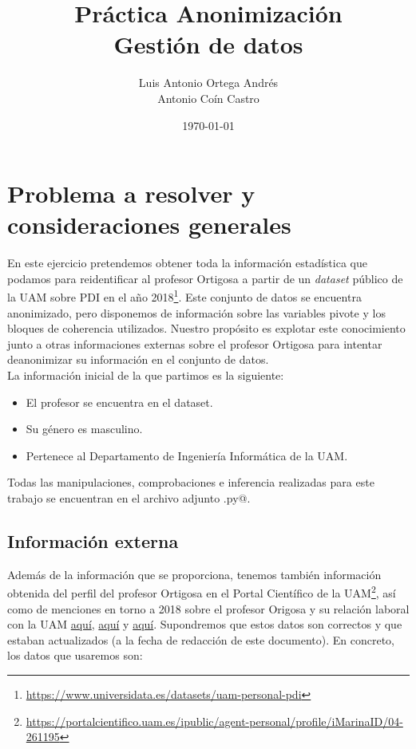 \documentclass[11pt]{article}
\author{Luis Antonio Ortega Andrés\\Antonio Coín Castro}
\date{\today}
\title{Práctica Anonimización\\\medskip
\large Gestión de datos}
\begin{document}
\maketitle

\section{Problema a resolver y consideraciones generales}

En este ejercicio pretendemos obtener toda la información estadística que podamos para reidentificar al profesor Ortigosa a partir de un \textit{dataset} público de la UAM sobre PDI en el año 2018\footnote{\href{https://www.universidata.es/datasets/uam-personal-pdi}{https://www.universidata.es/datasets/uam-personal-pdi}}. Este conjunto de datos se encuentra anonimizado, pero disponemos de información sobre las variables pivote y los bloques de coherencia utilizados. Nuestro propósito es explotar este conocimiento junto a otras informaciones externas sobre el profesor Ortigosa para intentar deanonimizar su información en el conjunto de datos.\\

La información inicial de la que partimos es la siguiente:

\begin{itemize}
  \item El profesor se encuentra en el dataset.
  \item Su género es masculino.
  \item Pertenece al Departamento de Ingeniería Informática de la UAM.
\end{itemize}

Todas las manipulaciones, comprobaciones e inferencia realizadas para este trabajo se encuentran en el archivo adjunto \verb@anon.py@.

\subsection{Información externa}

Además de la información que se proporciona, tenemos también información obtenida del perfil del profesor Ortigosa en el Portal Científico de la UAM\footnote{\href{https://portalcientifico.uam.es/ipublic/agent-personal/profile/iMarinaID/04-261195}{https://portalcientifico.uam.es/ipublic/agent-personal/profile/iMarinaID/04-261195}}, así como de menciones en torno a 2018 sobre el profesor Origosa y su relación laboral con la UAM \href{https://atip.es/wp-content/uploads/2018/06/Programa-EAI_2018-2019.pdf}{aquí}, \href{https://www.icfs-uam.es/miembros/}{aquí} y \href{https://www.madridnetwork.org/eventosmn/seminarioi4/}{aquí}. Supondremos que estos datos son correctos y que estaban actualizados (a la fecha de redacción de este documento). En concreto, los datos que usaremos son:
\end{document}

